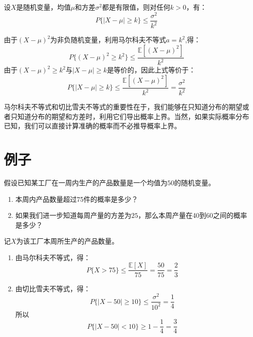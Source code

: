 \documentclass[10pt,a4paper,UTF8]{article}
\begin{document}
\begin{tikztheorem}
设\(X\)是随机变量，均值\(\mu\)和方差\(\sigma^{2}\)都是有限值，则对任何\(k > 0\)，有：
\begin{equation}
\label{eq:5}
P\{| X - \mu| \geq k\} \leq \frac{\sigma^{2}}{k^{2}}
\end{equation}
\end{tikztheorem}

\begin{tikzproof}
由于\((X-\mu)^{2}\)为非负随机变量，利用马尔科夫不等式\(a=k^{2}\),得：
\begin{equation}
\label{eq:6}
P\{ (X-\mu)^{2} \geq k^{2} \} \leq \frac{\mathbb{E}[ (X-\mu)^{2} ]}{k^{2}}
\end{equation}
由于\((X-\mu)^{2} \geq k^{2}\)与\(|X-\mu| \geq k\)是等价的，因此上式等价于：
\begin{equation}
\label{eq:7}
P\{ |X - \mu| \geq k \} \leq \frac{\mathbb{E}[(X-\mu)^{2}]}{k^{2}} = \frac{\sigma^{2}}{k^{2}}
\end{equation}
\end{tikzproof}

马尔科夫不等式和切比雪夫不等式的重要性在于，我们能够在只知道分布的期望或者只知道分布的期望和方差时，利用它们导出概率上界。当然，如果实际概率分布已知，我们可以直接计算准确的概率而不必推导概率上界。
\section{例子}
\label{sec:org60949d7}


\begin{tikzinstance}
假设已知某工厂在一周内生产的产品数量是一个均值为\(50\)的随机变量。
\begin{enumerate}
\item 本周内产品数量超过75件的概率是多少？
\item 如果我们进一步知道每周产量的方差为\(25\)，那么本周产量在40到60之间的概率是多少？
\end{enumerate}
\end{tikzinstance}
\begin{tikzanswer}
记\(X\)为该工厂本周所生产的产品数量。
\begin{enumerate}
\item 由马尔科夫不等式，得：\[ P\{ X > 75\} \leq \frac{\mathbb{E}[X]}{75} = \frac{50}{75} = \frac{2}{3}\]
\item 由切比雪夫不等式，得：\[ P\{ |X-50| \geq 10 \} \leq \frac{\sigma^{2}}{10^{2}} =\frac{1}{4} \]所以\[P\{ |X -50| < 10 \}\geq 1- \frac{1}{4} = \frac{3}{4}\]
\end{enumerate}
\end{tikzanswer}
\end{document}
